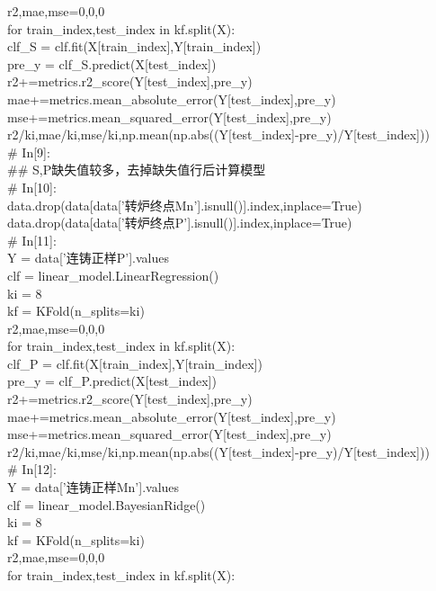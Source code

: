 \documentclass{xcumcmart}
\begin{document}
r2,mae,mse=0,0,0 \\
for train\_index,test\_index in kf.split(X): \\
clf\_S = clf.fit(X[train\_index],Y[train\_index]) \\
pre\_y = clf\_S.predict(X[test\_index]) \\
r2+=metrics.r2\_score(Y[test\_index],pre\_y) \\
mae+=metrics.mean\_absolute\_error(Y[test\_index],pre\_y) \\
mse+=metrics.mean\_squared\_error(Y[test\_index],pre\_y) \\
r2/ki,mae/ki,mse/ki,np.mean(np.abs((Y[test\_index]-pre\_y)/Y[test\_index])) \\
\# In[9]: \\
\#\# S,P缺失值较多，去掉缺失值行后计算模型 \\
\# In[10]: \\
data.drop(data[data['转炉终点Mn'].isnull()].index,inplace=True) \\
data.drop(data[data['转炉终点P'].isnull()].index,inplace=True) \\
\# In[11]: \\
Y = data['连铸正样P'].values \\
clf = linear\_model.LinearRegression() \\
ki = 8 \\
kf = KFold(n\_splits=ki) \\
r2,mae,mse=0,0,0 \\
for train\_index,test\_index in kf.split(X): \\
clf\_P = clf.fit(X[train\_index],Y[train\_index]) \\
pre\_y = clf\_P.predict(X[test\_index]) \\
r2+=metrics.r2\_score(Y[test\_index],pre\_y) \\
mae+=metrics.mean\_absolute\_error(Y[test\_index],pre\_y) \\
mse+=metrics.mean\_squared\_error(Y[test\_index],pre\_y) \\
r2/ki,mae/ki,mse/ki,np.mean(np.abs((Y[test\_index]-pre\_y)/Y[test\_index])) \\
\# In[12]: \\
Y = data['连铸正样Mn'].values \\
clf = linear\_model.BayesianRidge() \\
ki = 8 \\
kf = KFold(n\_splits=ki) \\
r2,mae,mse=0,0,0 \\
for train\_index,test\_index in kf.split(X): \\
\end{document}
